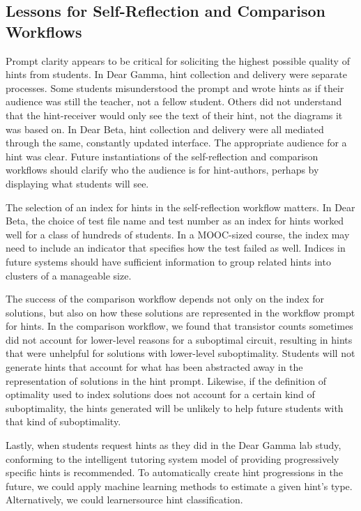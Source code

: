 \subsection{Lessons for Self-Reflection and Comparison Workflows}

Prompt clarity appears to be critical for soliciting the highest possible quality of hints from students. In Dear Gamma, hint collection and delivery were separate processes. Some students misunderstood the prompt and wrote hints as if their audience was still the teacher, not a fellow student. Others did not understand that the hint-receiver would only see the text of their hint, not the diagrams it was based on. In Dear Beta, hint collection and delivery were all mediated through the same, constantly updated interface. The appropriate audience for a hint was clear. Future instantiations of the self-reflection and comparison workflows should clarify who the audience is for hint-authors, perhaps by displaying what students will see. 

The selection of an index for hints in the self-reflection workflow matters. In Dear Beta, the choice of test file name and test number as an index for hints worked well for a class of hundreds of students. In a MOOC-sized course, the index may need to include an indicator that specifies how the test failed as well. Indices in future systems should have sufficient information to group related hints into clusters of a manageable size.

The success of the comparison workflow depends not only on the index for solutions, but also on how these solutions are represented in the workflow prompt for hints. In the comparison workflow, we found that transistor counts sometimes did not account for lower-level reasons for a suboptimal circuit, resulting in hints that were unhelpful for solutions with lower-level suboptimality. Students will not generate hints that account for what has been abstracted away in the representation of solutions in the hint prompt. Likewise, if the definition of optimality used to index solutions does not account for a certain kind of suboptimality, the hints generated will be unlikely to help future students with that kind of suboptimality. 

Lastly, when students request hints as they did in the Dear Gamma lab study, conforming to the intelligent tutoring system model of providing progressively specific hints is recommended. To automatically create hint progressions in the future, we could apply machine learning methods to estimate a given hint's type. Alternatively, we could learnersource hint classification. 

